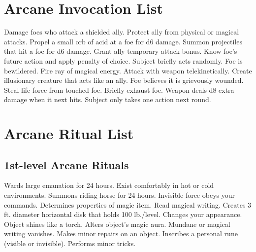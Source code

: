 \section{Arcane Invocation List}
\begin{swspelllist}
   Damage foes who attack a shielded ally.
   Protect ally from physical or magical attacks.
   Propel a small orb of acid at a foe for d6 damage.
   Summon projectiles that hit a foe for d6 damage.
   Grant ally temporary attack bonus.
   Know foe's future action and apply penalty of choice.
   Subject briefly acts randomly.
   Foe is bewildered.
   Fire ray of magical energy.
   Attack with weapon telekinetically.
   Create illusionary creature that acts like an ally.
   Foe believes it is grievously wounded.
   Steal life force from touched foe.
   Briefly exhaust foe.
   Weapon deals d8 extra damage when it next hits.
   Subject only takes one action next round.
\end{swspelllist}

\section{Arcane Ritual List}
\subsection{1st-level Arcane Rituals}
\begin{rituallist}
     Wards large emanation for 24 hours.
     Exist comfortably in hot or cold environments.
     Summons riding horse for 24 hours.
     Invisible force obeys your commands.
     Determines properties of magic item.
     Read magical writing.
     Creates 3 ft. diameter horizontal disk that holds 100 lb./level.
     Changes your appearance.
     Object shines like a torch.
     Alters object's magic aura.
     Mundane or magical writing vanishes.
     Makes minor repairs on an object.
     Inscribes a personal rune (visible or invisible).
     Performs minor tricks.
\end{rituallist}

